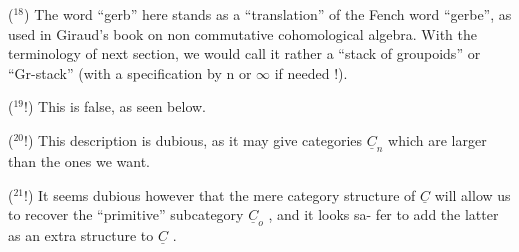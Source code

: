 (${}^{18}$)  The word ``gerb'' here stands  as a ``translation'' of the Fench
word ``gerbe'',  as used in Giraud's book on non commutative cohomological
algebra.  With the terminology of next section,  we would call it rather
a ``stack of groupoids'' or  ``Gr-stack'' (with a specification by n or $\infty$ if
needed !).

(${}^{19}$!)  This is false,  as seen below.

(${}^{20}$!)  This description is dubious,  as it may give categories $\underline{C}_{n}$ which
are larger than the ones we want.

(${}^{21}$!)  It seems dubious however that the mere category structure of $\underline{C}$ will
allow us to recover the  ``primitive'' subcategory $\underline{C}_{o}$ ,  and it looks sa-%
fer to add the latter as an extra structure to $\underline{C}$ .

